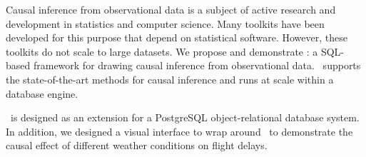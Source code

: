 Causal inference from observational data is a subject of active research and development in statistics and computer science. Many toolkits have been developed for this purpose that depend on statistical software.
However, these toolkits do not scale to large datasets.
We propose and demonstrate \GSQL: a SQL-based framework for drawing causal inference from observational data.
\GSQL\ supports the state-of-the-art methods for causal inference and runs at scale within a database engine.
 \GSQL\ is designed as an extension for a PostgreSQL object-relational database system. In addition, we designed a visual interface to wrap around \GSQL\  to demonstrate the causal effect of different weather conditions on flight delays. 